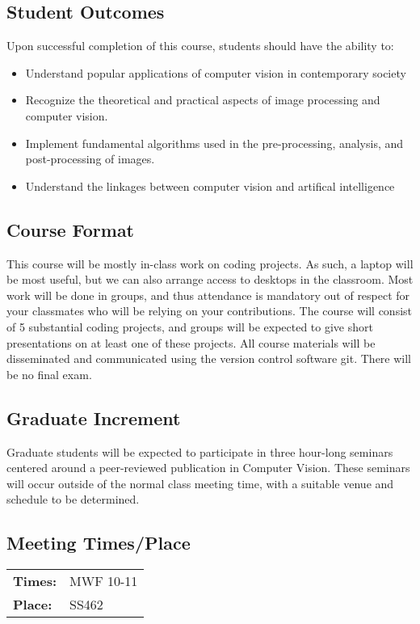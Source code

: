 \documentclass[12pt,letterpaper]{scrartcl}
\begin{document}
\subsection*{Student Outcomes}

Upon successful completion of this course, students should have the ability to:
\begin{itemize}
\item Understand popular applications of computer vision in contemporary society
\item Recognize the theoretical and practical aspects of image processing and computer vision.
\item Implement fundamental algorithms used in the pre-processing, analysis, and post-processing of images.
\item Understand the linkages between computer vision and artifical intelligence
\end{itemize}

\subsection*{Course Format}
This course will be mostly in-class work on coding projects.  As such, a laptop will be most useful, but we can also arrange access to desktops in the classroom.  Most work will be done in groups, and thus attendance is mandatory out of respect for your classmates who will be relying on your contributions.  The course will consist of 5 substantial coding projects, and groups will be expected to give short presentations on at least one of these projects.  All course materials will be disseminated and communicated using the version control software git.  There will be no final exam. 

\subsection*{Graduate Increment}
Graduate students will be expected to participate in three hour-long seminars centered around a peer-reviewed publication in Computer Vision.  These seminars will occur outside of the normal class meeting time, with a suitable venue and schedule to be determined. 
\subsection*{Meeting Times/Place}

\begin{tabular}{l l}
\textbf{Times:} & MWF 10-11\\
\textbf {Place:} & SS462\\
\end{tabular}
\end{document}
